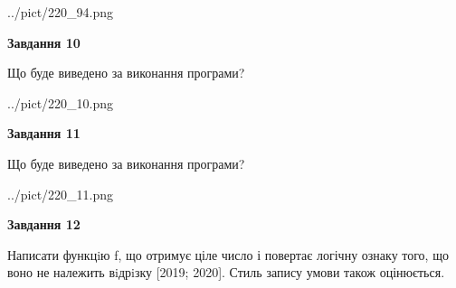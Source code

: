 \documentclass[12pt, ukrainian]{article}
\begin{document}
{\begin {large}
\begin{center}
	{../pict/220_94.png}
\end{center}
\newpage

{\begin {center}\textbf{Завдання 10}\end {center}}

Що буде виведено за виконання програми?\par
\begin{center}
	{../pict/220_10.png}
\end{center}
\newpage

{\begin {center}\textbf{Завдання 11}\end {center}}

Що буде виведено за виконання програми?\par
\begin{center}
	{../pict/220_11.png}
\end{center}
\newpage

{\begin {center}\textbf{Завдання 12}\end {center}}


Написати функцiю f, що отримує ціле число і повертає логічну ознаку того, що воно не належить вiдрiзку [2019; 2020]. Стиль запису умови також оцінюється.\par
\newpage

\end {large}}
\end{document}
